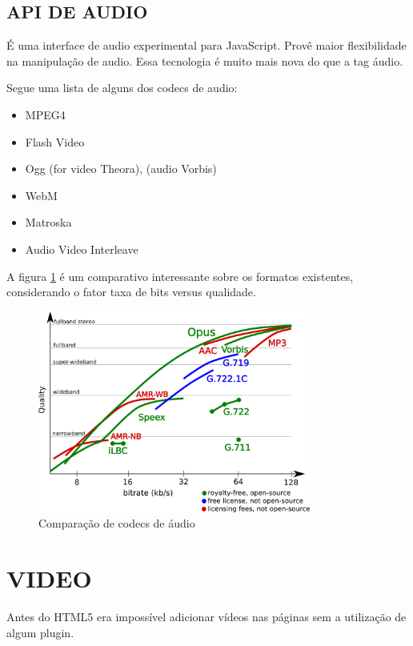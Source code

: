 \documentclass[
12pt,
a4paper,
portuges,
draft
]{report}
\begin{document}
\subsection{API DE AUDIO}

É uma interface de audio experimental para JavaScript. Provê maior
flexibilidade na manipulação de audio. Essa tecnologia é muito mais
nova do que a tag áudio.

Segue uma lista de alguns dos codecs de audio:
\begin{itemize}
    \item{MPEG4}
    \item{Flash Video}
    \item{Ogg} (for video Theora), (audio Vorbis)
    \item{WebM}
    \item{Matroska}
    \item{Audio Video Interleave}
\end{itemize}

A figura \ref{fig:audioCodecs} é um comparativo interessante sobre os formatos existentes, considerando o fator taxa de bits versus qualidade.

\begin{figure}
    \centering
    \includegraphics[width=0.8\textwidth,natwidth=610,natheight=642]{codec.png}
	\caption{Comparação de codecs de áudio}
    \label{fig:audioCodecs}
\end{figure}



\section{VIDEO}
Antes do HTML5 era impossível adicionar vídeos nas páginas sem a utilização de algum plugin.
\end{document}
